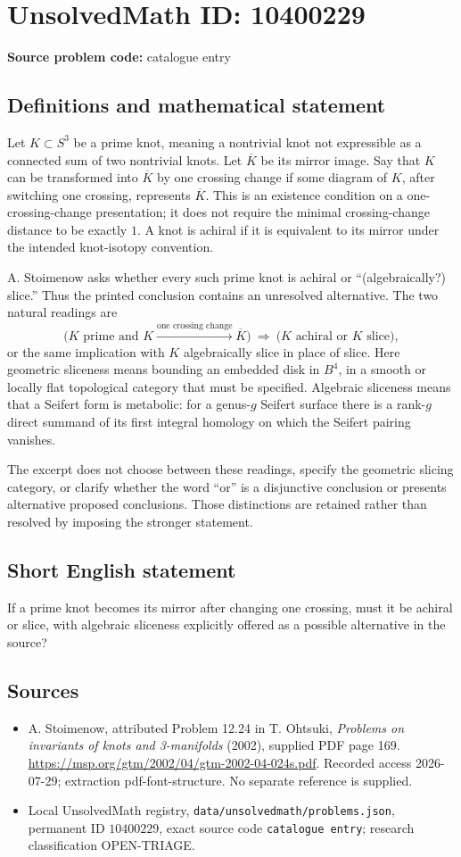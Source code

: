 \documentclass[11pt]{article}
\begin{document}
\section*{UnsolvedMath ID: 10400229}
\textbf{Source problem code:} catalogue entry
\subsection{Definitions and mathematical statement}
Let \(K\subset S^3\) be a prime knot, meaning a nontrivial knot not expressible as a connected sum of two nontrivial knots. Let \(\overline K\) be its mirror image. Say that \(K\) can be transformed into \(\overline K\) by one crossing change if some diagram of \(K\), after switching one crossing, represents \(\overline K\). This is an existence condition on a one-crossing-change presentation; it does not require the minimal crossing-change distance to be exactly \(1\). A knot is achiral if it is equivalent to its mirror under the intended knot-isotopy convention.

A. Stoimenow asks whether every such prime knot is achiral or ``(algebraically?) slice.'' Thus the printed conclusion contains an unresolved alternative. The two natural readings are
\[
 \bigl(K\text{ prime and }K\xrightarrow{\text{one crossing change}}\overline K\bigr)
 \ \Longrightarrow\ 
 \bigl(K\text{ achiral or }K\text{ slice}\bigr),
\]
or the same implication with \(K\) algebraically slice in place of slice. Here geometric sliceness means bounding an embedded disk in \(B^4\), in a smooth or locally flat topological category that must be specified. Algebraic sliceness means that a Seifert form is metabolic: for a genus-\(g\) Seifert surface there is a rank-\(g\) direct summand of its first integral homology on which the Seifert pairing vanishes.

The excerpt does not choose between these readings, specify the geometric slicing category, or clarify whether the word ``or'' is a disjunctive conclusion or presents alternative proposed conclusions. Those distinctions are retained rather than resolved by imposing the stronger statement.
\subsection{Short English statement}
If a prime knot becomes its mirror after changing one crossing, must it be achiral or slice, with algebraic sliceness explicitly offered as a possible alternative in the source?
\subsection{Sources}
\begin{itemize}
\item A. Stoimenow, attributed Problem 12.24 in T. Ohtsuki, \emph{Problems on invariants of knots and 3-manifolds} (2002), supplied PDF page 169. \url{https://msp.org/gtm/2002/04/gtm-2002-04-024s.pdf}. Recorded access 2026-07-29; extraction pdf-font-structure. No separate reference is supplied.
\item Local UnsolvedMath registry, \texttt{data/unsolvedmath/problems.json}, permanent ID \(10400229\), exact source code \texttt{catalogue entry}; research classification OPEN-TRIAGE.
\end{itemize}
\end{document}
